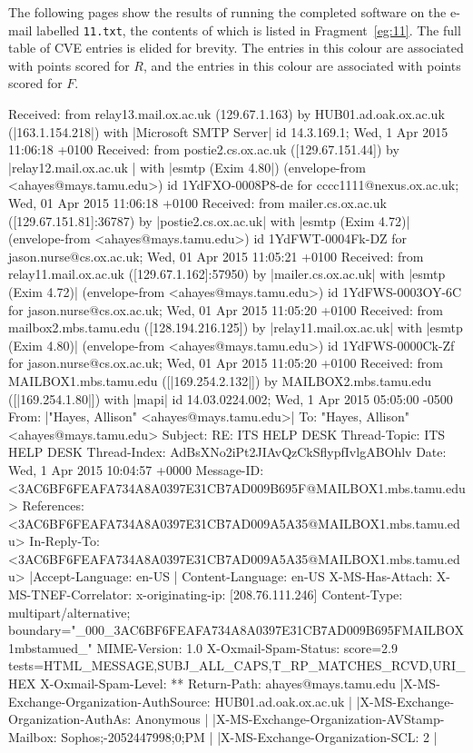 The following pages show the results of running the completed software on the
e-mail labelled \texttt{11.txt}, the contents of which is listed in
Fragment~\ref{eg:11}.  The full table of CVE entries is elided for brevity.  
The entries in \colorbox{red!30}{this colour} are associated with points scored
for $R$, and the entries in \colorbox{blue!30}{this colour} are associated with
points scored for $F$.

\begin{example}[caption=Email \texttt{11.txt},label=eg:11]
Received: from relay13.mail.ox.ac.uk (129.67.1.163) by HUB01.ad.oak.ox.ac.uk 
 (|\colorbox{red!30}{163.1.154.218}|) with |\colorbox{red!30}{Microsoft SMTP Server}| id 14.3.169.1; Wed, 1 Apr 2015 
 11:06:18 +0100 
Received: from postie2.cs.ox.ac.uk ([129.67.151.44])	by |\colorbox{red!30}{relay12.mail.ox.ac.uk }|
 with |\colorbox{red!30}{esmtp (Exim 4.80}|)	(envelope-from <ahayes@mays.tamu.edu>)	id 
 1YdFXO-0008P8-de	for cccc1111@nexus.ox.ac.uk; Wed, 01 Apr 2015 11:06:18 +0100 
Received: from mailer.cs.ox.ac.uk ([129.67.151.81]:36787)	by 
 |\colorbox{red!30}{postie2.cs.ox.ac.uk}| with |\colorbox{red!30}{esmtp (Exim 4.72)}|	(envelope-from 
 <ahayes@mays.tamu.edu>)	id 1YdFWT-0004Fk-DZ	for jason.nurse@cs.ox.ac.uk; Wed, 
 01 Apr 2015 11:05:21 +0100 
Received: from relay11.mail.ox.ac.uk ([129.67.1.162]:57950)	by 
|\colorbox{red!30}{mailer.cs.ox.ac.uk}| with |\colorbox{red!30}{esmtp (Exim 4.72)}|	(envelope-from 
 <ahayes@mays.tamu.edu>)	id 1YdFWS-0003OY-6C	for jason.nurse@cs.ox.ac.uk; Wed, 
 01 Apr 2015 11:05:20 +0100 
Received: from mailbox2.mbs.tamu.edu ([128.194.216.125])	by 
|\colorbox{red!30}{relay11.mail.ox.ac.uk}| with |\colorbox{red!30}{esmtp (Exim 4.80)}|	(envelope-from 
 <ahayes@mays.tamu.edu>)	id 1YdFWS-0000Ck-Zf	for jason.nurse@cs.ox.ac.uk; Wed, 
 01 Apr 2015 11:05:20 +0100 
Received: from MAILBOX1.mbs.tamu.edu ([|\colorbox{red!30}{169.254.2.132}|]) by
MAILBOX2.mbs.tamu.edu ([|\colorbox{red!30}{169.254.1.80}|]) with |\colorbox{red!30}{mapi}| id 14.03.0224.002; Wed, 1
Apr 2015 05:05:00 -0500
From: |\colorbox{blue!30}{"Hayes, Allison" <ahayes@mays.tamu.edu>}|
To: "Hayes, Allison" <ahayes@mays.tamu.edu>
Subject: RE: ITS HELP DESK
Thread-Topic: ITS HELP DESK
Thread-Index: AdBsXNo2iPt2JIAvQzCkSflypfIvlgABOhlv
Date: Wed, 1 Apr 2015 10:04:57 +0000 
Message-ID: <3AC6BF6FEAFA734A8A0397E31CB7AD009B695F@MAILBOX1.mbs.tamu.edu> 
References: <3AC6BF6FEAFA734A8A0397E31CB7AD009A5A35@MAILBOX1.mbs.tamu.edu> 
In-Reply-To: <3AC6BF6FEAFA734A8A0397E31CB7AD009A5A35@MAILBOX1.mbs.tamu.edu> 
|\colorbox{blue!30}{Accept-Language: en-US }|
Content-Language: en-US 
X-MS-Has-Attach: 
X-MS-TNEF-Correlator: 
x-originating-ip: [208.76.111.246] 
Content-Type: multipart/alternative; 
	boundary="_000_3AC6BF6FEAFA734A8A0397E31CB7AD009B695FMAILBOX1mbstamued_" 
MIME-Version: 1.0 
X-Oxmail-Spam-Status: score=2.9 tests=HTML_MESSAGE,SUBJ_ALL_CAPS,T_RP_MATCHES_RCVD,URI_HEX 
X-Oxmail-Spam-Level: ** 
Return-Path: ahayes@mays.tamu.edu 
|\colorbox{blue!30}{X-MS-Exchange-Organization-AuthSource: HUB01.ad.oak.ox.ac.uk }|
|\colorbox{blue!30}{X-MS-Exchange-Organization-AuthAs: Anonymous }|
|\colorbox{blue!30}{X-MS-Exchange-Organization-AVStamp-Mailbox: Sophos;-2052447998;0;PM }|
|\colorbox{blue!30}{X-MS-Exchange-Organization-SCL: 2 }|
\end{example}

